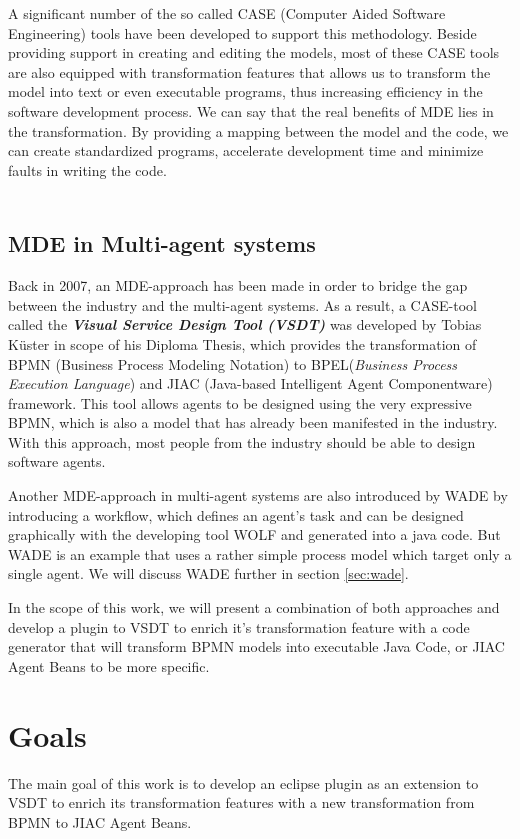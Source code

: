 A significant number of the so called  CASE (Computer Aided Software Engineering) tools have been developed to support this methodology. Beside providing support in creating and editing the models, most of these CASE tools are also equipped with transformation features that allows us to transform the model into text or even executable programs, thus increasing efficiency in the software development process. We can say that the real benefits of MDE lies in the transformation. By providing a mapping between the model and the code, we can create standardized programs, accelerate development time and minimize faults in writing the code. \\\\

\subsection{MDE in Multi-agent systems} 
Back in 2007, an MDE-approach has been made in order to bridge the gap between the industry and the multi-agent systems. As a result, a CASE-tool called the \textbf{\textit{Visual Service Design Tool (VSDT)}} was developed by Tobias K\"uster in scope of his Diploma Thesis, which provides the transformation of BPMN (Business Process Modeling Notation) to BPEL(\textit{Business Process Execution Language}) and JIAC (Java-based Intelligent Agent Componentware) framework. This tool allows agents to be designed using the very expressive BPMN, which is also a model that has already been manifested in the industry. With this approach, most people from the industry should be able to design software agents.

Another MDE-approach in multi-agent systems are also introduced by WADE by introducing a workflow, which defines an agent's task and can be designed graphically with the developing tool WOLF and generated into a java code. But WADE is an example that uses a rather simple process model which target only a single agent. We will discuss WADE further in section \ref{sec:wade}.

In the scope of this work, we will present a combination of both approaches and develop a plugin to VSDT to enrich it's transformation feature with a code generator that will transform BPMN models into executable Java Code, or JIAC Agent Beans to be more specific.

\section{Goals}
\label{sec:Goals}
The main goal of this work is to develop an eclipse plugin as an extension to VSDT to enrich its transformation features with a new transformation from BPMN to JIAC Agent Beans. \\

